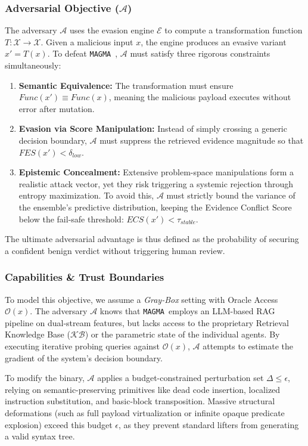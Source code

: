 \documentclass[pdflatex,sn-mathphys-num]{sn-jnl}
\newcommand{\sysname}{\texttt{MAGMA}~}
\begin{document}
\subsubsection{Adversarial Objective ($\mathcal{A}$)}
\label{sec:threat_objective}
The adversary $\mathcal{A}$ uses the evasion engine $\mathcal{E}$ to compute a transformation function $T: \mathcal{X} \rightarrow \mathcal{X}$. Given a malicious input $x$, the engine produces an evasive variant $x' = T(x)$. To defeat \sysname, $\mathcal{A}$ must satisfy three rigorous constraints simultaneously:

\begin{enumerate}
    \item \textbf{Semantic Equivalence:} The transformation must ensure $Func(x') \equiv Func(x)$, meaning the malicious payload executes without error after mutation.
    \item \textbf{Evasion via Score Manipulation:} Instead of simply crossing a generic decision boundary, $\mathcal{A}$ must suppress the retrieved evidence magnitude so that $FES(x') < \delta_{low}$.
    \item \textbf{Epistemic Concealment:} Extensive problem-space manipulations form a realistic attack vector, yet they risk triggering a systemic rejection through entropy maximization. To avoid this, $\mathcal{A}$ must strictly bound the variance of the ensemble's predictive distribution, keeping the Evidence Conflict Score below the fail-safe threshold: $ECS(x') < \tau_{stable}$.
\end{enumerate}

The ultimate adversarial advantage is thus defined as the probability of securing a confident benign verdict without triggering human review.

\subsubsection{Capabilities \& Trust Boundaries}
\label{sec:threat_capabilities}
To model this objective, we assume a \textit{Gray-Box} setting with Oracle Access $\mathcal{O}(x)$. The adversary $\mathcal{A}$ knows that \sysname employs an LLM-based RAG pipeline on dual-stream features, but lacks access to the proprietary Retrieval Knowledge Base ($\mathcal{KB}$) or the parametric state of the individual agents. By executing iterative probing queries against $\mathcal{O}(x)$, $\mathcal{A}$ attempts to estimate the gradient of the system's decision boundary.

To modify the binary, $\mathcal{A}$ applies a budget-constrained perturbation set $\Delta \leq \epsilon$, relying on semantic-preserving primitives like dead code insertion, localized instruction substitution, and basic-block transposition. Massive structural deformations (such as full payload virtualization or infinite opaque predicate explosion) exceed this budget $\epsilon$, as they prevent standard lifters from generating a valid syntax tree.
\end{document}
